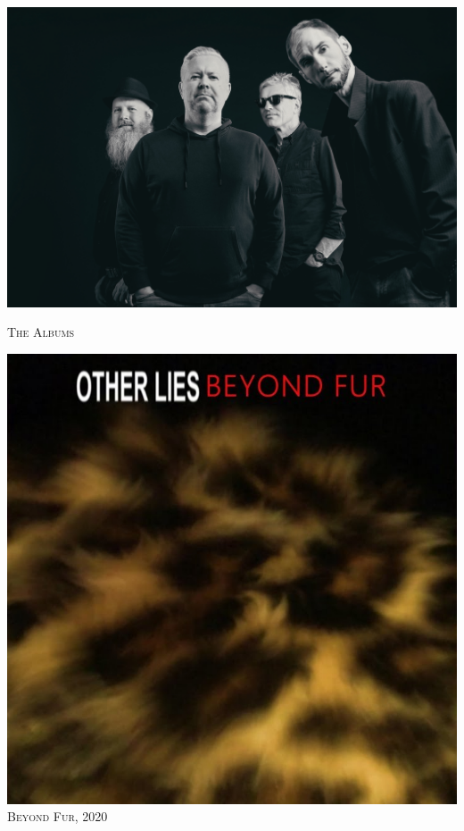 \begin{titlepage}
  \centering
  \includegraphics[width=\paperwidth]{Other-Lies-Band.jpeg}\\

  \newpage
  \pagecolor{black}
  \color{white}

  \begin{center}
    {\Huge \sffamily \scshape The Albums}\\
  \end{center}

  \begin{minipage}[t]{.25\textheight}
    \centering
    \includegraphics[height=0.25\textheight]{1-Beyond-Fur/beyond-fur.jpg}\\
    \vspace{1em}
    {\Large \scshape Beyond Fur, 2020}
  \end{minipage}


\end{titlepage}
